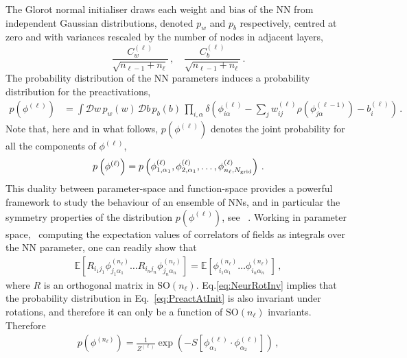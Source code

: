 \documentclass[11pt]{article}
\begin{document}
The Glorot normal initialiser draws each weight and bias of the NN from independent Gaussian
distributions, denoted $p_w$ and $p_b$ respectively, centred at zero and with variances 
rescaled by the number of nodes in adjacent layers, 
\begin{equation}
    \label{eq:RescaledGlorotVariances}
    \frac{C^{(\ell)}_{w}}{\sqrt{n_{\ell-1} + n_{\ell}}}\, , 
    \quad \frac{C^{(\ell)}_{b}}{\sqrt{n_{\ell-1} + n_{\ell}}}\, .
\end{equation}
The probability distribution of the NN parameters induces a probability distribution for the 
preactivations, 
\begin{align}
    \label{eq:PreactAtInit}
    p\left(\phi^{(\ell)}\right) 
      &= \int \mathcal{D}w\, p_w(w)\,
        \mathcal{D}b\, p_b(b)\, \prod_{i,\alpha} 
        \delta\left(
          \phi^{(\ell)}_{i\alpha} - \sum_{j} w^{(\ell)}_{ij} 
          \rho\left(\phi^{(\ell-1)}_{j\alpha}\right) 
          - b^{(\ell)}_i 
          \right)\, .
\end{align}
Note that, here and in what follows, $p(\phi^{(\ell)})$ denotes the joint probability for all the components 
of $\phi^{(\ell)}$, 
\begin{align}
    \label{eq:ExplIndices}
    p\left(\phi^{(\ell)}\right) = p\left(\phi^{(\ell)}_{1,\alpha_1}, \phi^{(\ell)}_{2,\alpha_1}, \ldots, 
        \phi^{(\ell)}_{n_\ell,N_{\mathrm{grid}}}\right)\, .
\end{align}
This duality between parameter-space and function-space provides a powerful framework to study 
the behaviour of an ensemble of NNs, and in particular the symmetry properties of the distribution
$p(\phi^{(\ell)})$, see \eg~\cite{Maiti:2021fpy}. Working in parameter space, \ie\ computing the 
expectation values of correlators of fields as integrals over the NN parameter, one can readily 
show that 
\begin{align}
    \label{eq:NeurRotInv}
    \mathbb{E}\left[
        R_{i_1j_1} \phi^{(n_\ell)}_{j_1 \alpha_1} \ldots
        R_{i_nj_n} \phi^{(n_\ell)}_{j_n \alpha_n}
    \right] = 
    \mathbb{E}\left[
        \phi^{(n_\ell)}_{i_1 \alpha_1} \ldots
        \phi^{(n_\ell)}_{i_n \alpha_n}
    \right]\, ,
\end{align}
where $R$ is an orthogonal matrix in $\text{SO}(n_{\ell})$. Eq.\eqref{eq:NeurRotInv} implies 
that the probability distribution in Eq.~\eqref{eq:PreactAtInit} is also invariant under rotations, 
and therefore it can only be a function of $\text{SO}(n_{\ell})$ invariants. Therefore 
\begin{align}
    \label{eq:PriorAction}
    p\left(\phi^{(n_\ell)}\right) = 
        \frac{1}{Z^{(\ell)}} \exp\left(-S\left[\phi^{(\ell)}_{\alpha_1} 
            \cdot \phi^{(\ell)}_{\alpha_2}\right]\right)\, , 
\end{align}
\end{document}
